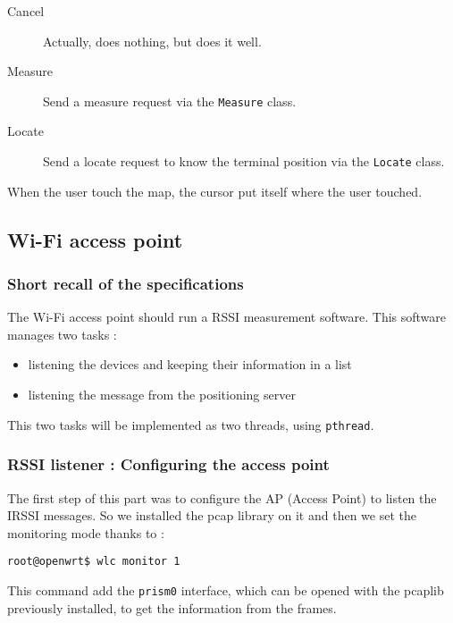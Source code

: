 \begin{description}
    \item[Cancel] Actually, does nothing, but does it well.
    \item[Measure] Send a measure request via the \verb+Measure+ class.
    \item[Locate] Send a locate request to know the terminal position via the
        \verb+Locate+ class.
\end{description}

When the user touch the map, the cursor put itself where the user touched.

\newpage
\subsection{Wi-Fi access point}

\subsubsection{Short recall of the specifications}

The Wi-Fi access point should run a RSSI measurement software. This software
manages two tasks :

\begin{itemize}
    \item listening the devices and keeping their information in a list
    \item listening the message from the positioning server
\end{itemize}

This two tasks will be implemented as two threads, using \verb+pthread+.

\subsubsection{RSSI listener : Configuring the access point}

The first step of this part was to configure the AP (Access Point) to listen
the IRSSI messages. So we installed the pcap library on it and then we set the
monitoring mode thanks to :

\begin{verbatim}
root@openwrt$ wlc monitor 1
\end{verbatim}

This command add the \verb+prism0+ interface, which can be opened with the
pcaplib previously installed, to get the information from the frames.

